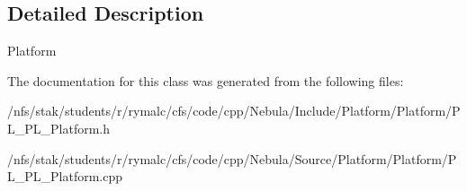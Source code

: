 \subsection{Detailed Description}
Platform 

The documentation for this class was generated from the following files:\begin{DoxyCompactItemize}
\item 
/nfs/stak/students/r/rymalc/cfs/code/cpp/Nebula/Include/Platform/Platform/PL\_\-PL\_\-Platform.h\item 
/nfs/stak/students/r/rymalc/cfs/code/cpp/Nebula/Source/Platform/Platform/PL\_\-PL\_\-Platform.cpp\end{DoxyCompactItemize}
